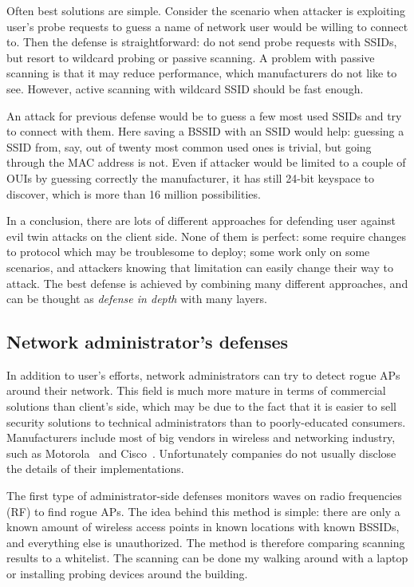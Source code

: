 \documentclass[12pt,a4paper,oneside,pdftex]{report}
\begin{document}
Often best solutions are simple. Consider the scenario when attacker is exploiting user's probe requests to guess a name of network user would be willing to connect to. Then the defense is straightforward: do not send probe requests with SSIDs, but resort to wildcard probing or passive scanning. A problem with passive scanning is that it may reduce performance, which manufacturers do not like to see. However, active scanning with wildcard SSID should be fast enough.

An attack for previous defense would be to guess a few most used SSIDs and try to connect with them. Here saving a BSSID with an SSID would help: guessing a SSID from, say, out of twenty most common used ones is trivial, but going through the MAC address is not. Even if attacker would be limited to a couple of OUIs by guessing correctly the manufacturer, it has still 24-bit keyspace to discover, which is more than 16 million possibilities.

In a conclusion, there are lots of different approaches for defending user against evil twin attacks on the client side. None of them is perfect: some require changes to protocol which may be troublesome to deploy; some work only on some scenarios, and attackers knowing that limitation can easily change their way to attack. The best defense is achieved by combining many different approaches, and can be thought as \emph{defense in depth} with many layers.

\subsection{Network administrator's defenses}

In addition to user's efforts, network administrators can try to detect rogue APs around their network. This field is much more mature in terms of commercial solutions than client's side, which may be due to the fact that it is easier to sell security solutions to technical administrators than to poorly-educated consumers. Manufacturers include most of big vendors in wireless and networking industry, such as Motorola~\cite{motorola_airdefense} and Cisco~\cite{cisco_ips}. Unfortunately companies do not usually disclose the details of their implementations.

The first type of administrator-side defenses monitors waves on radio frequencies (RF) to find rogue APs. The idea behind this method is simple: there are only a known amount of wireless access points in known locations with known BSSIDs, and everything else is unauthorized. The method is therefore comparing scanning results to a whitelist. The scanning can be done my walking around with a laptop or installing probing devices around the building.~\cite{proxim_rogue_ap}
\end{document}
